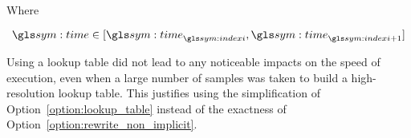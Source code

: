 	Where

	\begin{equation}
		\timesym \in [\timesym_{\indexi}, \timesym_{\indexi + 1}]
	\end{equation}

	Using a lookup table did not lead to any noticeable impacts on the
	speed of execution, even when a large number of samples was taken to build
	a high-resolution lookup table. This justifies using the simplification of
	Option~\ref{option:lookup_table} instead of the exactness of
	Option~\ref{option:rewrite_non_implicit}.

